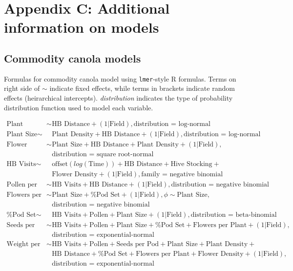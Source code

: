 \documentclass[12pt]{article} %
\begin{document}
\clearpage

\section*{Appendix C: Additional information on models}

\subsection*{Commodity canola models}

Formulas for commodity canola model using \texttt{lmer}-style R formulas. Terms on right side of $\sim$ indicate fixed effects, while terms in brackets indicate random effects (heirarchical intercepts). \textit{distribution} indicates the type of probability distribution function used to model each variable.

\begin{align*}
    \text{Plant Density} \sim & \text{HB Distance} + (1|\text{Field}), \text{distribution = log-normal} \\
    \text{Plant Size} \sim & \text{Plant Density} + \text{HB Distance} + (1|\text{Field}),\text{distribution = log-normal} \\
    \text{Flower Density} \sim & \text{Plant Size} + \text{HB Distance} + \text{Plant Density} + (1|\text{Field}),\\
    &   \text{distribution = square root-normal} \\
    \text{HB Visits} \sim & \text{offset}(log(\text{Time})) + \text{HB Distance} + \text{Hive Stocking} + \\ 
    &   \text{Flower Density} + (1|\text{Field}), \text{family = negative binomial}\\
    \text{Pollen per Stigma} \sim & \text{HB Visits} + \text{HB Distance} + (1|\text{Field}), \text{distribution = negative binomial} \\
    \text{Flowers per Plant} \sim & \text{Plant Size} + \text{\% Pod Set} + (1|\text{Field}), \phi \sim \text{Plant Size}, \\
    &     \text{distribution = negative binomial} \\
    \text{\% Pod Set} \sim & \text{HB Visits} + \text{Pollen} + \text{Plant Size} + (1|\text{Field}), \text{distribution = beta-binomial} \\
    \text{Seeds per Pod} \sim & \text{HB Visits} + \text{Pollen} + \text{Plant Size} + \text{\% Pod Set} + \text{Flowers per Plant} + (1|\text{Field}),\\ 
    &   \text{distribution = exponential-normal} \\
    \text{Weight per Seed} \sim & \text{HB Visits} + \text{Pollen} + \text{Seeds per Pod} + \text{Plant Size} + \text{Plant Density} +\\
    &   \text{HB Distance} + \text{\% Pod Set} + \text{Flowers per Plant} + \text{Flower Density} + (1|\text{Field}),\\
    &   \text{distribution = exponential-normal} \\
\end{align*}
\end{document}
